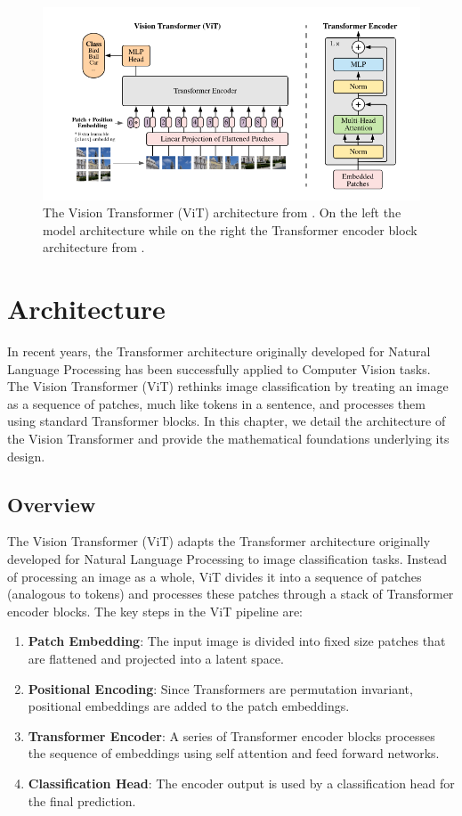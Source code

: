 \begin{figure}[t]
  \center
  \includegraphics[width=1\textwidth]{images/vit-architecture.png}
  \caption{The Vision Transformer (ViT) architecture from \cite{alexey2020image}. On the left the model architecture while on the right the Transformer encoder block architecture from \cite{vaswani2017attention}.}
  \label{fig:vit-architecture}
\end{figure}

\section{Architecture}

In recent years, the Transformer architecture originally developed for Natural Language Processing has been successfully applied to Computer Vision tasks. The Vision Transformer (ViT) rethinks image classification by treating an image as a sequence of patches, much like tokens in a sentence, and processes them using standard Transformer blocks. In this chapter, we detail the architecture of the Vision Transformer and provide the mathematical foundations underlying its design.

\subsection{Overview}
The Vision Transformer (ViT) adapts the Transformer architecture originally developed for Natural Language Processing to image classification tasks. Instead of processing an image as a whole, ViT divides it into a sequence of patches (analogous to tokens) and processes these patches through a stack of Transformer encoder blocks. The key steps in the ViT pipeline are:

\begin{enumerate}
  \item \textbf{Patch Embedding}: The input image is divided into fixed size patches that are flattened and projected into a latent space.
  \item \textbf{Positional Encoding}: Since Transformers are permutation invariant, positional embeddings are added to the patch embeddings.
  \item \textbf{Transformer Encoder}: A series of Transformer encoder blocks processes the sequence of embeddings using self attention and feed forward networks.
  \item \textbf{Classification Head}: The encoder output is used by a classification head for the final prediction.
\end{enumerate}

